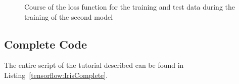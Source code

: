 \begin{figure}[H]
    \caption{Course of the loss function for the training and test data during the training of the second model}
    \label{TensorFlowIrisPlotHist4}
\end{figure}


\subsection{Complete Code}

The entire script of the tutorial described can be found in Listing~\ref{tensorflow:IrisComplete}.

\begin{code}
    
    
    \caption{Complete Python programme for the Iris data set}\label{tensorflow:IrisComplete}
\end{code}


